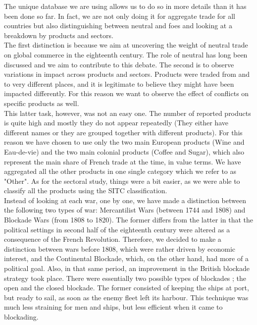\documentclass[12pt,a4paper,notitlepage,english]{article}
\begin{document}
\iffalse
The unique database we are using allows us to do so in more details than it has been done so far.
In fact, we are not only doing it for aggregate trade for all countries but also distinguishing between neutral and foes and looking at a breakdown by products and sectors. \\
The first distinction is because we aim at uncovering the weight of neutral trade on global commerce in the eighteenth century.
The role of neutral has long been discussed and we aim to contribute to this debate.
The second is to observe variations in impact across products and sectors.
Products were traded from and to very different places, and it is legitimate to believe they might have been impacted differently.
For this reason we want to observe the effect of conflicts on specific products as well.\\
This latter task, however, was not an easy one.
The number of reported products is quite high and mostly they do not appear repeatedly (They either have different names or they are grouped together with different products).
For this reason we have chosen to use only the two main European products (Wine and Eau-de-vie) and the two main colonial products (Coffee and Sugar), which also represent the main share of French trade at the time, in value terms.
We have aggregated all the other products in one single category which we refer to as "Other".
As for the sectoral study, things were a bit easier, as we were able to classify all the products using the SITC classification.\\
Instead of looking at each war, one by one, we have made a distinction between the following two types of war: Mercantilist Wars (between 1744 and 1808) and Blockade Wars (from 1808 to 1820).
The former differs from the latter in that the political settings in second half of the eighteenth century were altered as a consequence of the French Revolution.
Therefore, we decided to make a distinction between wars before 1808, which were rather driven by economic interest, and the Continental Blockade, which, on the other hand, had more of a political goal.
Also, in that same period, an improvement in the British blockade strategy took place.
There were essentially two possible types of blockades \citep{rainerdevelopment}; the open and the closed blockade.
The former consisted of keeping the ships at port, but ready to sail, as soon as the enemy fleet left its harbour.
This technique was much less straining for men and ships, but less efficient when it came to blockading.
\end{document}

